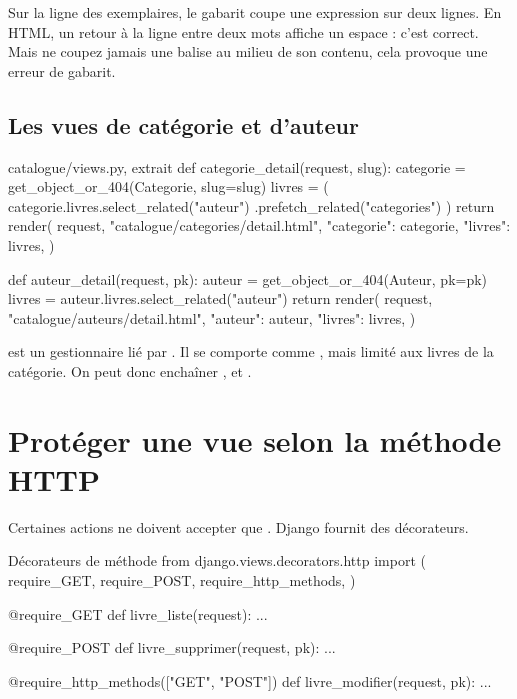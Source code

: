 \begin{attention}
Sur la ligne des exemplaires, le gabarit coupe une expression sur deux lignes. En
HTML, un retour à la ligne entre deux mots affiche un espace : c'est correct. Mais
ne coupez jamais une balise  au milieu de son contenu, cela
provoque une erreur de gabarit.
\end{attention}

\subsection{Les vues de catégorie et d'auteur}

\begin{codebox}[python]{catalogue/views.py, extrait}
def categorie_detail(request, slug):
    categorie = get_object_or_404(Categorie, slug=slug)
    livres = (
        categorie.livres.select_related("auteur")
        .prefetch_related("categories")
    )
    return render(
        request,
        "catalogue/categories/detail.html",
        {"categorie": categorie, "livres": livres},
    )


def auteur_detail(request, pk):
    auteur = get_object_or_404(Auteur, pk=pk)
    livres = auteur.livres.select_related("auteur")
    return render(
        request,
        "catalogue/auteurs/detail.html",
        {"auteur": auteur, "livres": livres},
    )
\end{codebox}

\begin{note}
 est un gestionnaire lié par . Il se
comporte comme , mais limité aux livres de la catégorie. On
peut donc enchaîner ,  et .
\end{note}

\section{Protéger une vue selon la méthode HTTP}

Certaines actions ne doivent accepter que . Django fournit des
décorateurs.

\begin{codebox}[python]{Décorateurs de méthode}
from django.views.decorators.http import (
    require_GET,
    require_POST,
    require_http_methods,
)


@require_GET
def livre_liste(request):
    ...


@require_POST
def livre_supprimer(request, pk):
    ...


@require_http_methods(["GET", "POST"])
def livre_modifier(request, pk):
    ...
\end{codebox}

